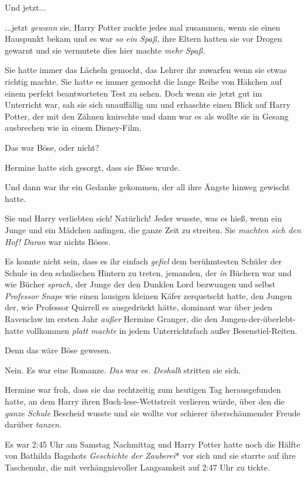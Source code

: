 {Und jetzt...

...jetzt \emph{gewann} sie, Harry Potter zuckte jedes mal zusammen, wenn sie einen Hauspunkt bekam und es war \emph{so ein Spaß,} ihre Eltern hatten sie vor Drogen gewarnt und sie vermutete dies hier machte \emph{mehr Spaß.}

Sie hatte immer das Lächeln gemocht, das Lehrer ihr zuwarfen wenn sie etwas richtig machte. Sie hatte es immer gemocht die lange Reihe von Häkchen auf einem perfekt beantworteten Test zu sehen. Doch wenn sie jetzt gut im Unterricht war, sah sie sich unauffällig um und erhaschte einen Blick auf Harry Potter, der mit den Zähnen knirschte und dann war es als wollte sie in Gesang ausbrechen wie in einem Disney-Film.

Das war Böse, oder nicht?

Hermine hatte sich gesorgt, dass sie Böse wurde.

Und dann war ihr ein Gedanke gekommen, der all ihre Ängste hinweg gewischt hatte.

Sie und Harry verliebten sich! Natürlich! Jeder wusste, was es hieß, wenn ein Junge und ein Mädchen anfingen, die ganze Zeit zu streiten. Sie \emph{machten sich den Hof!} \emph{Daran} war nichts Böses.

Es konnte nicht sein, dass es ihr einfach \emph{gefiel} dem berühmtesten Schüler der Schule in den schulischen Hintern zu treten, jemanden, der \emph{in} Büchern war und wie Bücher \emph{sprach,} der Junge der den Dunklen Lord bezwungen und selbst \emph{Professor Snape} wie einen lausigen kleinen Käfer zerquetscht hatte, den Jungen der, wie Professor Quirrell es ausgedrückt hätte, dominant war über jeden Ravenclaw im ersten Jahr \emph{außer} Hermine Granger, die den Jungen-der-überlebt-hatte vollkommen \emph{platt machte} in jedem Unterrichtsfach außer Besenstiel-Reiten.

Denn das wäre Böse gewesen.

Nein. Es war eine Romanze. \emph{Das} war es. \emph{Deshalb} stritten sie sich.

Hermine war froh, dass sie das rechtzeitig zum heutigen Tag herausgefunden hatte, an dem Harry ihren Buch-lese-Wettstreit verlieren würde, über den die \emph{ganze Schule} Bescheid wusste und sie wollte vor schierer überschäumender Freude darüber \emph{tanzen.}

Es war 2:45 Uhr am Samstag Nachmittag und Harry Potter hatte noch die Hälfte von Bathilda Bagshots \emph{Geschichte der Zauberei}* vor sich und sie starrte auf ihre Taschenuhr, die mit verhängnisvoller Langsamkeit auf 2:47 Uhr zu tickte.

}

